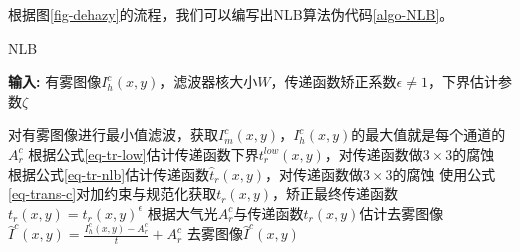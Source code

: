 根据图\ref{fig-dehazy}的流程，我们可以编写出NLB算法伪代码\ref{algo-NLB}。

\begin{algorithm}[ht]
    \caption{NLB}
    \label{algo-NLB}
    \textbf{输入:} 有雾图像$I_h^c(x,y)$，滤波器核大小$W$，传递函数矫正系数$\epsilon\neq1$，下界估计参数$\zeta$
    \begin{algorithmic}
    \State 对有雾图像进行最小值滤波，获取$I_m^c(x,y)$，$I_h^c(x,y)$的最大值就是每个通道的$A_r^c$
    \State 根据公式\eqref{eq-tr-low}估计传递函数下界$t_r^{low}(x,y)$，对传递函数做$3\times 3$的腐蚀
    \State 根据公式\eqref{eq-tr-nlb}估计传递函数$\hat t_r(x,y)$，对传递函数做$3\times 3$的腐蚀
    \State 使用公式\eqref{eq-trans-c}对加约束与规范化获取$t_r(x,y)$，矫正最终传递函数$t_r(x,y) = t_r(x,y)^\epsilon$
    \State 根据大气光$A_r^c$与传递函数$t_r(x,y)$估计去雾图像$\hat I^c(x,y) = \frac{I_h^c(x,y) - A_r^c}{t} + A_r^c$
    \State \Return 去雾图像$\hat I^c(x,y)$
    \end{algorithmic}
\end{algorithm}
